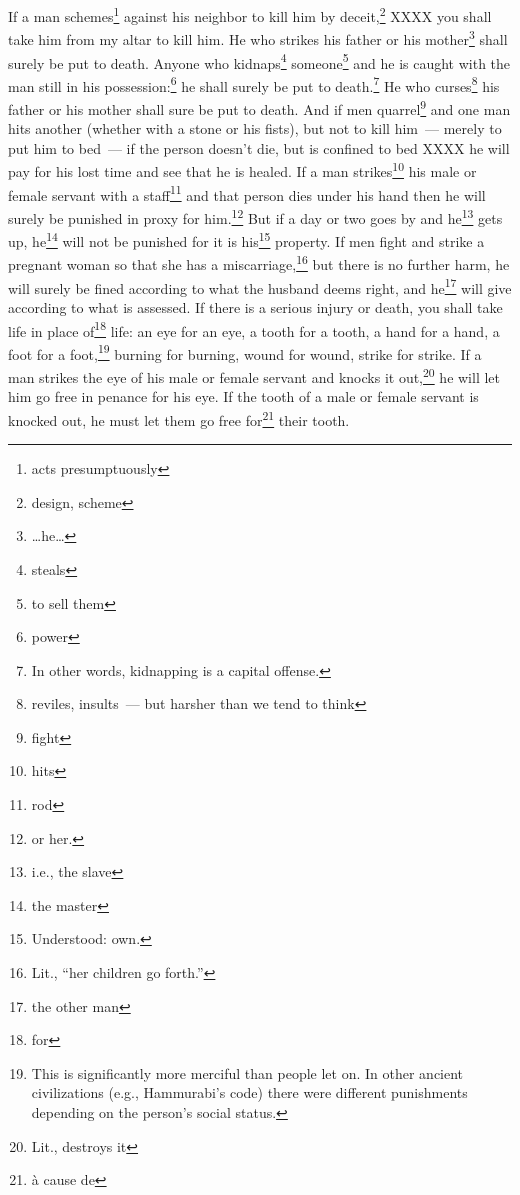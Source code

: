 \begin{enumerate}[align=center]
     If a man schemes\footnote{acts presumptuously} against his neighbor to kill him by deceit,\footnote{design, scheme} XXXX you shall take him from my altar to kill him.%
     He who strikes his father or his mother\footnote{\dots he\dots} shall surely be put to death.%
     Anyone who kidnaps\footnote{steals} someone\footnote{to sell them} and he is caught with the man still in his possession:\footnote{power} he shall surely be put to death.\footnote{In other words, kidnapping is a capital offense.}%
     He who curses\footnote{reviles, insults~--- but harsher than we tend to think} his father or his mother shall sure be put to death.%
     And if men quarrel\footnote{fight} and one man hits another (whether with a stone or his fists), but not to kill him~--- merely to put him to bed~---%
     if the person doesn't die, but is confined to bed XXXX he will pay for his lost time and see that he is healed.%
     If a man strikes\footnote{hits} his male or female servant with a staff\footnote{rod} and that person dies under his hand then he will surely be punished in proxy for him.\footnote{or her.}%
     But if a day or two goes by and he\footnote{i.e., the slave} gets up, he\footnote{the master} will not be punished for it is his\footnote{Understood: own.} property.%
     If men fight and strike a pregnant woman so that she has a miscarriage,\footnote{Lit., ``her children go forth.''} but there is no further harm, he will surely be fined according to what the husband deems right, and he\footnote{the other man} will give according to what is assessed.%
     If there is a serious injury or death, you shall take life in place of\footnote{for} life:%
     an eye for an eye, a tooth for a tooth, a hand for a hand, a foot for a foot,\footnote{This is significantly more merciful than people let on. In other ancient civilizations (e.g., Hammurabi's code) there were different punishments depending on the person's social status.}%
     burning for burning, wound for wound, strike for strike.%
     If a man strikes the eye of his male or female servant and knocks it out,\footnote{Lit., destroys it} he will let him go free in penance for his eye.%
     If the tooth of a male or female servant is knocked out, he must let them go free for\footnote{\`a cause de} their tooth.%

\end{enumerate}
